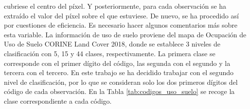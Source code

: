 \documentclass[12pt,a4paper,]{book}
\numberwithin{dummy}{section}
\theoremstyle{ocrenumbox}
\theoremstyle{blacknumex}
\theoremstyle{blacknumbox}
\theoremstyle{ocrenum}
\theoremstyle{ocrenum}
\begin{document}
\begin{itemize}
\begin{itemize}
    cubriese el centro del píxel. Y posteriormente, para cada
    observación se ha extraído el valor del píxel sobre el que
    estuviese. De nuevo, se ha procedido así por cuestiones de
    eficiencia. Es necesario hacer algunos comentarios más sobre esta
    variable. La información de uso de suelo proviene del mapa de
    Ocupación de Uso de Suelo CORINE Land Cover 2018, donde se establece
    3 niveles de clasificación con 5, 15 y 44 clases, respectivamente.
    La primera clase se corresponde con el primer dígito del código, las
    segunda con el segundo y la tercera con el tercero. En este trabajo
    se ha decidido trabajar con el segundo nivel de clasificación, por
    lo que se consideran solo los dos primeros dígitos del código de
    cada observación. En la Tabla \ref{tab:codigos_uso_suelo} se recoge
    la clase correspondiente a cada código.
  \end{itemize}
\end{itemize}
\end{document}
